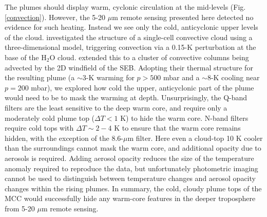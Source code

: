 \documentclass[final,authoryear,5p,times,twocolumn]{elsarticle}
\begin{document}
The plumes should display warm, cyclonic circulation at the mid-levels (Fig. \ref{convection}).  However, the 5-20 $\mu$m remote sensing presented here detected no evidence for such heating. Instead we see only the cold, anticyclonic upper levels of the cloud.  \citet{01hueso} investigated the structure of a single-cell convective cloud using a three-dimensional model, triggering convection via a 0.15-K perturbation at the base of the H$_2$O cloud.  \citet{02hueso} extended this to a cluster of convective columns being advected by the 2D windfield of the SEB.  Adopting their thermal structure for the resulting plume (a $\sim3$-K warming for $p>500$ mbar and a $\sim8$-K cooling near $p=200$ mbar), we explored how cold the upper, anticyclonic part of the plume would need to be to mask the warming at depth.  Unsurprisingly, the Q-band filters are the least sensitive to the deep warm core, and require only a moderately cold plume top ($\Delta T<1$ K) to hide the warm core.  N-band filters require cold tops with $\Delta T\sim2-4$ K to ensure that the warm core remains hidden, with the exception of the 8.6-$\mu$m filter.  Here even a cloud-top 10 K cooler than the surroundings cannot mask the warm core, and additional opacity due to aerosols is required.  Adding aerosol opacity reduces the size of the temperature anomaly required to reproduce the data, but unfortunately photometric imaging cannot be used to distinguish between temperature changes and aerosol opacity changes within the rising plumes.  In summary, the cold, cloudy plume tops of the MCC would successfully hide any warm-core features in the deeper troposphere from 5-20 $\mu$m remote sensing.
\end{document}
